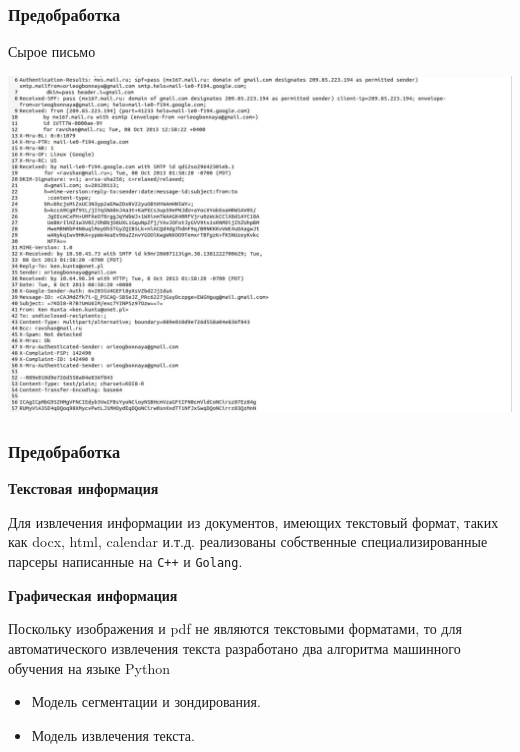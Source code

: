 \documentclass[compress,professionalfont]{beamer}
\begin{document}
\begin{frame}
\frametitle{Предобработка}

Сырое письмо
\begin{center}
\includegraphics[width=.9\textwidth]{eml_raw.jpg}
\end{center}

\end{frame}

\begin{frame}[fragile=singleslide]
\frametitle{Предобработка}

\textbf{Текстовая информация}

Для извлечения информации из документов, имеющих текстовый формат, таких как docx, html, calendar и.т.д. реализованы собственные специализированные парсеры написанные на \verb|C++| и \verb|Golang|.
\vspace{.5cm}

\textbf{Графическая информация}

Поскольку изображения и pdf не являются текстовыми форматами, то
для автоматического извлечения текста разработано два алгоритма машинного обучения на языке Python
\begin{itemize}
\item Модель сегментации и зондирования.
\item Модель извлечения текста.
\end{itemize}

\end{frame}
\end{document}
